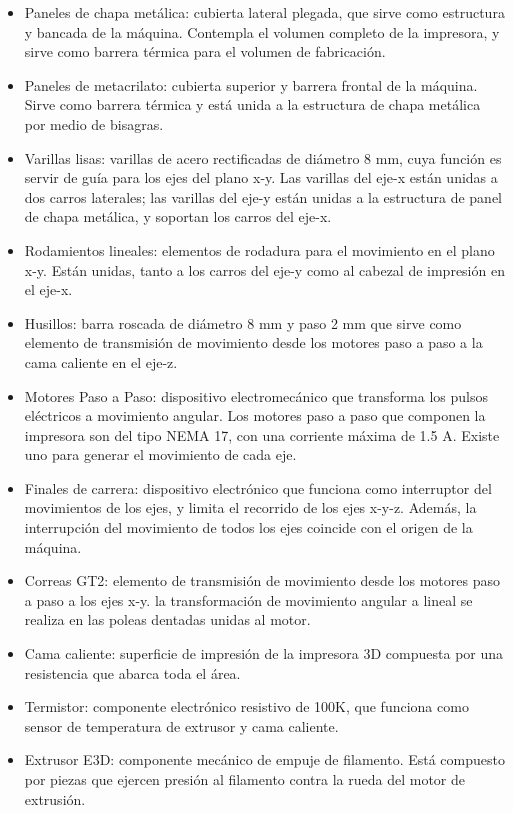 \begin{itemize}
\item Paneles de chapa metálica: cubierta lateral plegada, que sirve como estructura y bancada de la máquina. Contempla el volumen completo de la impresora, y sirve como barrera térmica para el volumen de fabricación. 
\item Paneles de metacrilato: cubierta superior y barrera frontal de la máquina. Sirve como barrera térmica y está unida a la estructura de chapa metálica por medio de bisagras.
\item Varillas lisas: varillas de acero rectificadas de diámetro 8 mm, cuya función es servir de guía para los ejes del plano x-y. Las varillas del eje-x están unidas a dos carros laterales; las varillas del eje-y están unidas a la estructura de panel de chapa metálica, y soportan los carros del eje-x.
\item Rodamientos lineales: elementos de rodadura para el movimiento en el plano x-y. Están unidas, tanto a los carros del eje-y como al cabezal de impresión en el eje-x.
\item Husillos: barra roscada de diámetro 8 mm y paso 2 mm que sirve como elemento de transmisión de movimiento desde los motores paso a paso a la cama caliente en el eje-z. 
\item Motores Paso a Paso: dispositivo electromecánico que transforma los pulsos eléctricos a movimiento angular. Los motores paso a paso que componen la impresora son del tipo NEMA 17, con una corriente máxima de 1.5 A. Existe uno para generar el movimiento de cada eje.
\item Finales de carrera: dispositivo electrónico que funciona como interruptor del movimientos de los ejes, y limita el recorrido de los ejes x-y-z. Además, la interrupción del movimiento de todos los ejes coincide con el origen de la máquina.
\item Correas GT2: elemento de transmisión de movimiento desde los motores paso a paso a los ejes x-y. la transformación de movimiento angular a lineal se realiza en las poleas dentadas unidas al motor.
\item Cama caliente: superficie de impresión de la impresora 3D compuesta por una resistencia que abarca toda el área. 
\item Termistor: componente electrónico resistivo de 100K, que funciona como sensor de temperatura de extrusor y cama caliente.
\item Extrusor E3D: componente mecánico de empuje de filamento. Está compuesto por piezas que ejercen presión al filamento contra la rueda del motor de extrusión.

\end{itemize}
